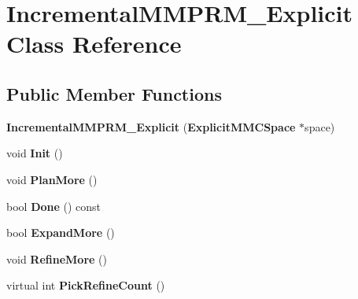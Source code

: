 \section{Incremental\+M\+M\+P\+R\+M\+\_\+\+Explicit Class Reference}
\label{classIncrementalMMPRM__Explicit}
\subsection*{Public Member Functions}
\begin{DoxyCompactItemize}
\item 
{\bfseries Incremental\+M\+M\+P\+R\+M\+\_\+\+Explicit} ({\bf Explicit\+M\+M\+C\+Space} $\ast$space)\label{classIncrementalMMPRM__Explicit_a975918f1352ddc700399fee959ae9276}

\item 
void {\bfseries Init} ()\label{classIncrementalMMPRM__Explicit_aa912a31c589fae6add6e9d405a7b0f6f}

\item 
void {\bfseries Plan\+More} ()\label{classIncrementalMMPRM__Explicit_a0e39e957cba994fd8fc0b62784f07936}

\item 
bool {\bfseries Done} () const \label{classIncrementalMMPRM__Explicit_a3027af2f3b265c2a0e80eec664ad3693}

\item 
bool {\bfseries Expand\+More} ()\label{classIncrementalMMPRM__Explicit_a3512e4bba5f5689d2992d1acce889ca2}

\item 
void {\bfseries Refine\+More} ()\label{classIncrementalMMPRM__Explicit_a5927f31ea3d4b304418e0776d028a8be}

\item 
virtual int {\bfseries Pick\+Refine\+Count} ()\label{classIncrementalMMPRM__Explicit_a3517b2328a1fb174a1b3e12c2f0591ca}

\end{DoxyCompactItemize}
